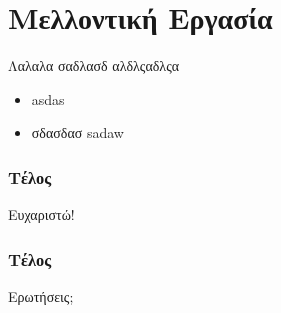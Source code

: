 \documentclass{beamer}
\begin{document}
\section{Μελλοντική Εργασία}
\begin{frame}
  Λαλαλα σαδλασδ αλδλςαδλςα
  \begin{itemize}
      \item asdas
      \item σδασδασ sadaw
  \end{itemize}
\end{frame}

\begin{frame}
  \frametitle{Τέλος}
  \centering
  Ευχαριστώ!
\end{frame}

\begin{frame}
  \frametitle{Τέλος}
  \centering
  Ερωτήσεις;
\end{frame}
\end{document}
